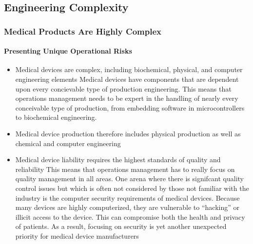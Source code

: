 \subsection{Engineering Complexity}
\begin{frame}
  \frametitle{Medical Products Are Highly Complex}
  \framesubtitle{Presenting Unique Operational Risks}
  \begin{itemize}
    \item<1-> Medical devices are complex, including biochemical, physical, and computer engineering elements
       {\scriptsize{Medical devices have components that are dependent upon every concievable type of production engineering. This means that operations management needs to be expert in the handling of nearly every conceivable type of production, from embedding software in microcontrollers to biochemical engineering. }}

    \item<2-> Medical device production therefore includes physical production as well as chemical and computer engineering

    \item<3-> Medical device liability requires the highest standards of quality and reliability
       {\scriptsize{This means that operations management has to really focus on quality management in all areas. One arena where there is signifcant quality control issues but which is often not considered by those not familiar with the industry is the computer security requirements of medical devices. Because many devices are highly computerized, they are vulnerable to ``hacking'' or illicit access to the device. This can compromise both the health and privacy of patients. As a result, focusing on security is yet another unexpected priority for medical device manufacturers \parencite{hagerSecuringPrivateMedical2020}}}

  \end{itemize}
\end{frame}
